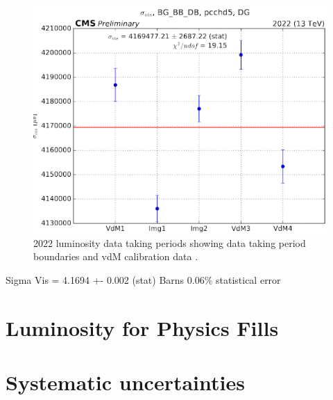 \begin{figure}[!htp]
\centering
\includegraphics[width=1\textwidth]{ashish_thesis/2022_sigma_vis_per_scan.png}
\caption[2018 CMS luminosity data taking periods.]{%
  2022 luminosity data taking periods showing data taking period boundaries and vdM calibration data  \cite{CERNLumiPublicResults}.
}
\label{fig:period_bound}
\end{figure}



Sigma Vis =  4.1694 +- 0.002 (stat) Barns
0.06\% statistical error




\section{Luminosity for Physics Fills}










\section{Systematic uncertainties}



